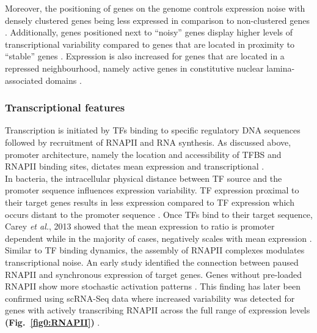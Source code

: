 Moreover, the positioning of genes on the genome controls expression noise with densely clustered genes being less  expressed in comparison to non-clustered genes \citep{Kustatscher2017}. 
Additionally, genes positioned next to “noisy” genes display higher levels of transcriptional variability compared to genes that are located in proximity to “stable” genes \citep{Kar2017}. 
Expression  is also increased for genes that are located in a repressed neighbourhood, namely active genes in constitutive nuclear lamina-associated domains \citep{Faure2017}.

\subsubsection{Transcriptional features}

Transcription is initiated by TFs binding to specific regulatory DNA sequences followed by recruitment of RNAPII and RNA synthesis. 
As discussed above, promoter architecture, namely the location and accessibility of TFBS and RNAPII binding sites, dictates mean expression and transcriptional . \\

In bacteria, the intracellular physical distance between TF source and the promoter sequence influences expression variability. 
TF expression proximal to their target genes results in less  expression compared to TF expression which occurs distant to the promoter sequence \citep{Goni-Moreno2017}. 
Once TFs bind to their target sequence, Carey \emph{et al.}, 2013 showed that the mean expression to  ratio is promoter dependent while in the majority of cases,  negatively scales with mean expression \citep{Carey2013}. \\

Similar to TF binding dynamics, the assembly of RNAPII complexes modulates transcriptional noise. 
An early study identified the connection between paused RNAPII and synchronous expression of target genes. 
Genes without pre-loaded RNAPII show more stochastic activation patterns \citep{Boettiger2009}. 
This finding has later been confirmed using scRNA-Seq data where increased variability was detected for genes with actively transcribing RNAPII across the full range of expression levels \textbf{(Fig.~\ref{fig0:RNAPII})} \citep{Day2016}.
\\

